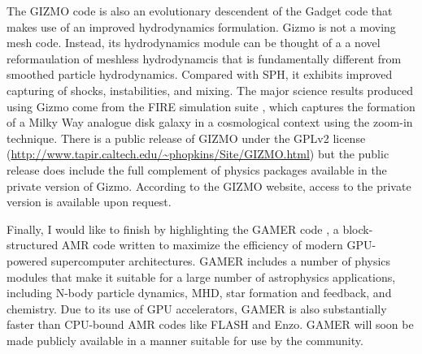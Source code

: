 \documentclass[11pt,twoside]{article}
\begin{document}
The GIZMO code \citep{hopkins2015} is also an evolutionary descendent of the Gadget code that makes use of an improved hydrodynamics formulation. Gizmo is not a moving mesh code. Instead, its hydrodynamics module can be thought of a a novel reformaulation of meshless hydrodynamcis that is fundamentally different from smoothed particle hydrodynamics. Compared with SPH, it exhibits improved capturing of shocks, instabilities, and mixing. The major science results produced using Gizmo come from the FIRE simulation suite \citep{hopkins2017}, which captures the formation of a Milky Way analogue disk galaxy in a cosmological context using the zoom-in technique. There is a public release of GIZMO under the GPLv2 license ({\small \url{http://www.tapir.caltech.edu/~phopkins/Site/GIZMO.html}}) but the public release does include the full complement of physics packages available in the private version of Gizmo. According to the GIZMO website, access to the private version is available upon request.


Finally, I would like to finish by highlighting the GAMER code \citep{schive2010}, a block-structured AMR code written to maximize the efficiency of modern GPU-powered supercomputer architectures. GAMER includes a number of physics modules that make it suitable for a large number of astrophysics applications, including N-body particle dynamics, MHD, star formation and feedback, and chemistry. Due to its use of GPU accelerators, GAMER is also substantially faster than CPU-bound AMR codes like FLASH and Enzo. GAMER will soon be made publicly available in a manner suitable for use by the community.


\end{document}
